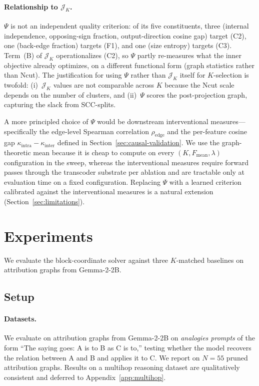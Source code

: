 \documentclass[table, 11pt]{article}
\begin{document}
\paragraph{Relationship to $\mathcal{J}_K$.}
$\Psi$ is not an independent quality criterion: of its five
constituents, three (internal independence, opposing-sign fraction,
output-direction cosine gap) target (C2), one (back-edge fraction)
targets (F1), and one (size entropy) targets (C3). Term~(B) of
$\mathcal{J}_K$ operationalizes (C2), so $\Psi$ partly re-measures
what the inner objective already optimizes, on a different
functional form (graph statistics rather than Ncut). The
justification for using $\Psi$ rather than $\mathcal{J}_K$ itself
for $K$-selection is twofold: (i)~$\mathcal{J}_K$ values are not
comparable across $K$ because the Ncut scale depends on the number
of clusters, and (ii)~$\Psi$ scores the post-projection graph,
capturing the slack from SCC-splits.

A more principled choice of $\Psi$ would be downstream
interventional measures---specifically the edge-level Spearman
correlation $\rho_{\text{edge}}$ and the per-feature cosine gap
$\kappa_{\text{intra}} - \kappa_{\text{inter}}$ defined in
Section~\ref{sec:causal-validation}. We use the graph-theoretic mean
because it is cheap to compute on every
$(K, F_{\text{mean}}, \lambda)$ configuration in the sweep, whereas
the interventional measures require forward passes through the
transcoder substrate per ablation and are tractable only at
evaluation time on a fixed configuration. Replacing $\Psi$ with a
learned criterion calibrated against the interventional measures is
a natural extension (Section~\ref{sec:limitations}).

\section{Experiments}\label{sec:exp}

We evaluate the block-coordinate solver against three $K$-matched
baselines on attribution graphs from Gemma-2-2B.

\subsection{Setup}

\paragraph{Datasets.}
We evaluate on attribution graphs from Gemma-2-2B on
\emph{analogies prompts} of the form ``The saying goes: A is to B as
C is to,'' testing whether the model recovers the relation between
A and B and applies it to C. We report on $N=55$ pruned attribution
graphs. Results on a multihop reasoning dataset are qualitatively
consistent and deferred to Appendix~\ref{app:multihop}.
\end{document}
